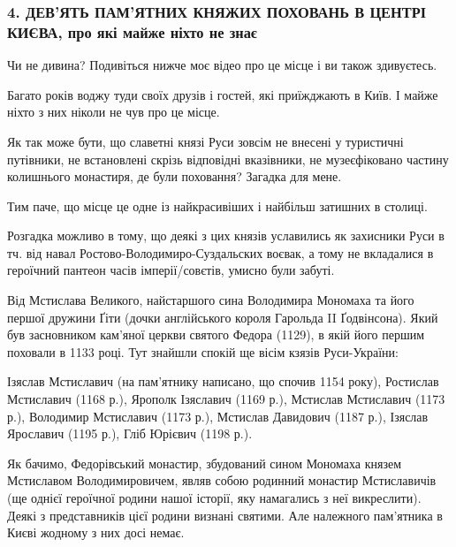  
 
 
 
 
\subsubsection{4. ДЕВ'ЯТЬ ПАМ'ЯТНИХ КНЯЖИХ ПОХОВАНЬ В ЦЕНТРІ КИЄВА, про які майже ніхто не знає}

Чи не дивина? Подивіться нижче моє відео про це місце і ви також здивуєтесь.

Багато років воджу туди своїх друзів і гостей, які приїжджають в Київ. І майже
ніхто з них ніколи не чув про це місце.

Як так може бути, що славетні князі Руси зовсім не внесені у туристичні
путівники, не встановлені скрізь відповідні вказівники, не музеєфіковано
частину колишнього монастиря, де були поховання? Загадка для мене. 

Тим паче, що місце це одне із найкрасивіших і найбільш затишних в столиці. 

Розгадка можливо в тому, що деякі з цих князів уславились як захисники Руси в
тч. від навал Ростово-Володимиро-Суздальских воєвак, а тому не вкладалися в
героїчний пантеон часів імперії/совєтів, умисно були забуті.

Від Мстислава Великого, найстаршого сина Володимира Мономаха та його першої
дружини Ґіти (дочки англійського короля Гарольда II Ґодвінсона). Який був
засновником кам'яної церкви святого Федора (1129), в якій його першим поховали
в 1133 році. Тут знайшли спокій ще вісім кзязів Руси-України: 

Ізяслав Мстиславич (на пам’ятнику написано, що спочив 1154 року), Ростислав
Мстиславич (1168 р.), Ярополк Ізяславич (1169 р.), Мстислав Мстиславич (1173
р.), Володимир Мстиславич (1173 р.), Мстислав Давидович (1187 р.), Ізяслав
Ярославич (1195 р.), Гліб Юрієвич (1198 р.). 

Як бачимо, Федорівський монастир, збудований сином Мономаха князем Мстиславом
Володимировичем, являв собою родинний монастир Мстиславичів (ще однієї
героїчної родини нашої історії, яку намагались з неї викреслити). Деякі з
представників цієї родини визнані святими. Але належного пам’ятника в Києві
жодному з них досі немає.

